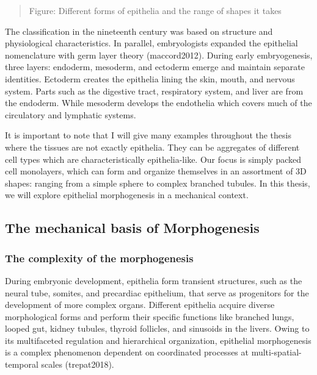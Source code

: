 \documentclass[
]{article}
\begin{document}
\begin{quote}
Figure: Different forms of epithelia and the range of shapes it takes
\end{quote}

The classification in the nineteenth century was based on structure and
physiological characteristics. In parallel, embryologists expanded the
epithelial nomenclature with germ layer theory (maccord2012). During
early embryogenesis, three layers: endoderm, mesoderm, and ectoderm
emerge and maintain separate identities. Ectoderm creates the epithelia
lining the skin, mouth, and nervous system. Parts such as the digestive
tract, respiratory system, and liver are from the endoderm. While
mesoderm develops the endothelia which covers much of the circulatory
and lymphatic systems.

It is important to note that I will give many examples throughout the
thesis where the tissues are not exactly epithelia. They can be
aggregates of different cell types which are characteristically
epithelia-like. Our focus is simply packed cell monolayers, which can
form and organize themselves in an assortment of 3D shapes: ranging from
a simple sphere to complex branched tubules. In this thesis, we will
explore epithelial morphogenesis in a mechanical context.

\hypertarget{the-mechanical-basis-of-morphogenesis-1}{%
\subsection{The mechanical basis of
Morphogenesis}\label{the-mechanical-basis-of-morphogenesis-1}}

\hypertarget{the-complexity-of-the-morphogenesis}{%
\subsubsection{The complexity of the
morphogenesis}\label{the-complexity-of-the-morphogenesis}}

During embryonic development, epithelia form transient structures, such
as the neural tube, somites, and precardiac epithelium, that serve as
progenitors for the development of more complex organs. Different
epithelia acquire diverse morphological forms and perform their specific
functions like branched lungs, looped gut, kidney tubules, thyroid
follicles, and sinusoids in the livers. Owing to its multifaceted
regulation and hierarchical organization, epithelial morphogenesis is a
complex phenomenon dependent on coordinated processes at
multi-spatial-temporal scales (trepat2018).
\end{document}
